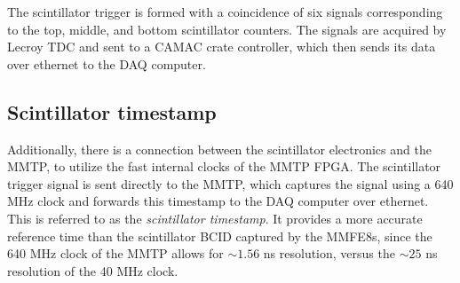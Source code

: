 The scintillator trigger is formed with a coincidence of six signals corresponding to the top, middle, and bottom scintillator counters. The signals are acquired by Lecroy TDC and sent to a CAMAC crate controller, which then sends its data over ethernet to the DAQ computer.

\subsection{Scintillator timestamp}
\label{sec:exp-scitime}

Additionally, there is a connection between the scintillator electronics and the MMTP, to utilize the fast internal clocks of the MMTP FPGA. The scintillator trigger signal is sent directly to the MMTP, which captures the signal using a 640 MHz clock and forwards this timestamp to the DAQ computer over ethernet. This is referred to as the \textit{scintillator timestamp}. It provides a more accurate reference time than the scintillator BCID captured by the MMFE8s, since the 640 MHz clock of the MMTP allows for $\sim\!1.56$ ns resolution, versus the $\sim\!25$ ns resolution of the 40 MHz clock.

